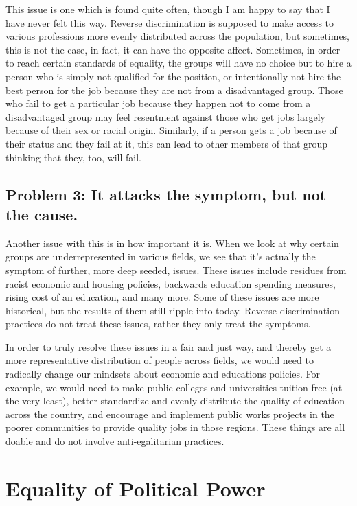 This issue is one which is found quite often, though I am happy to say that I have never felt this way. Reverse discrimination is supposed to make access to various professions more evenly distributed across the population, but sometimes, this is not the case, in fact, it can have the opposite affect. Sometimes, in order to reach certain standards of equality, the groups will have no choice but to hire a person who is simply not qualified for the position, or intentionally not hire the best person for the job because they are not from a disadvantaged group. Those who fail to get a particular job because they happen not to come from a disadvantaged group may feel resentment against those who get jobs largely because of their sex or racial origin. Similarly, if a person gets a job because of their status and they fail at it, this can lead to other members of that group thinking that they, too, will fail.
\subsection{Problem 3: It attacks the symptom, but not the cause.}

Another issue with this is in how important it is. When we look at why certain groups are underrepresented in various fields, we see that it's actually the symptom of further, more deep seeded, issues. These issues include residues from racist economic and housing policies, backwards education spending measures, rising cost of an education, and many more. Some of these issues are more historical, but the results of them still ripple into today. Reverse discrimination practices do not treat these issues, rather they only treat the symptoms.

In order to truly resolve these issues in a fair and just way, and thereby get a more representative distribution of people across fields, we would need to radically change our mindsets about economic and educations policies. For example, we would need to make public colleges and universities tuition free (at the very least), better standardize and evenly distribute the quality of education across the country, and encourage and implement public works projects in the poorer communities to provide quality jobs in those regions. These things are all doable and do not involve anti-egalitarian practices.

\section{Equality of Political Power}

